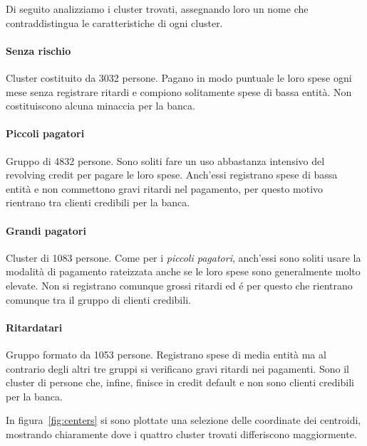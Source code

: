 Di seguito analizziamo i cluster trovati, assegnando loro 
un nome che contraddistingua le caratteristiche 
di ogni cluster.

\paragraph{Senza rischio}
Cluster costituito da 3032 persone. Pagano in modo puntuale
le loro spese ogni mese senza registrare ritardi e compiono 
solitamente spese di bassa entit\`a. Non costituiscono alcuna
minaccia per la banca.

\paragraph{Piccoli pagatori}
Gruppo di 4832 persone. Sono soliti fare un uso abbastanza 
intensivo del revolving credit per pagare le loro spese. 
Anch'essi registrano spese di bassa entit\`a e non commettono
gravi ritardi nel pagamento, per questo motivo rientrano tra
clienti credibili per la banca.

\paragraph{Grandi pagatori}
Cluster di 1083 persone. Come per i \textit{piccoli pagatori}, 
anch'essi sono soliti usare la modalit\`a di pagamento 
rateizzata anche se le loro spese sono generalmente molto elevate.
Non si registrano comunque grossi ritardi ed \'e per questo che
rientrano comunque tra il gruppo di clienti credibili.

\paragraph{Ritardatari}
Gruppo formato da 1053 persone. Registrano spese di media entit\`a
ma al contrario degli altri tre gruppi si verificano gravi ritardi
nei pagamenti. Sono il cluster di persone che, infine, finisce in
credit default e non sono clienti credibili per la banca.

In figura~\ref{fig:centers} si sono plottate una selezione
delle coordinate dei centroidi, mostrando chiaramente dove i quattro
cluster trovati differiscono maggiormente.

